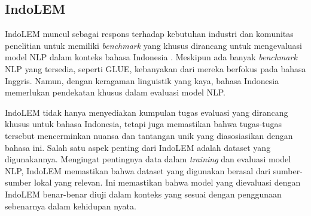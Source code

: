 \subsection{IndoLEM}
IndoLEM muncul sebagai respons terhadap kebutuhan industri dan komunitas penelitian untuk memiliki \textit{benchmark} yang khusus dirancang untuk mengevaluasi model NLP dalam konteks bahasa Indonesia \parencite{indobert}. Meskipun ada banyak \textit{benchmark} NLP yang tersedia, seperti GLUE, kebanyakan dari mereka berfokus pada bahasa Inggris. Namun, dengan keragaman linguistik yang kaya, bahasa Indonesia memerlukan pendekatan khusus dalam evaluasi model NLP.

IndoLEM tidak hanya menyediakan kumpulan tugas evaluasi yang dirancang khusus untuk bahasa Indonesia, tetapi juga memastikan bahwa tugas-tugas tersebut mencerminkan nuansa dan tantangan unik yang diasosiasikan dengan bahasa ini. Salah satu aspek penting dari IndoLEM adalah dataset yang digunakannya. Mengingat pentingnya data dalam \textit{training} dan evaluasi model NLP, IndoLEM memastikan bahwa dataset yang digunakan berasal dari sumber-sumber lokal yang relevan. Ini memastikan bahwa model yang dievaluasi dengan IndoLEM benar-benar diuji dalam konteks yang sesuai dengan penggunaan sebenarnya dalam kehidupan nyata.